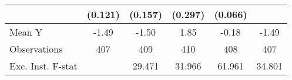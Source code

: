{\begin{tabular}{l*{5}{c}}
            &     (0.121)         &     (0.157)         &     (0.297)         &     (0.066)         &                     \\
\midrule
Mean Y      &       -1.49         &       -1.50         &        1.85         &       -0.18         &       -1.49         \\
Observations&         407         &         409         &         410         &         408         &         407         \\
Exc. Inst. F-stat&                     &      29.471         &      31.966         &      61.961         &      34.801         \\
\bottomrule
\end{tabular}
}

